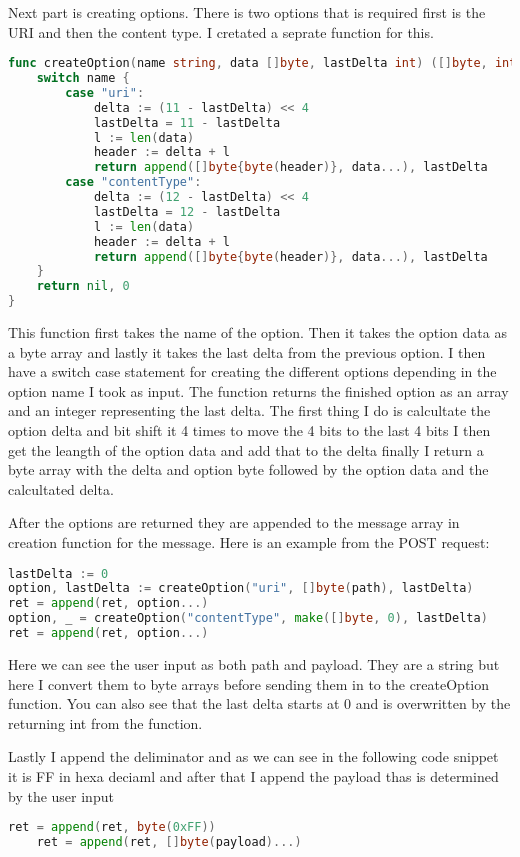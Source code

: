 \documentclass{article}
\begin{document}
    Next part is creating options. There is two options that is required first is the URI and then
    the content type. I cretated a seprate function for this.
\begin{lstlisting}[language=go]
func createOption(name string, data []byte, lastDelta int) ([]byte, int) {
    switch name {
	    case "uri":
		    delta := (11 - lastDelta) << 4
		    lastDelta = 11 - lastDelta
		    l := len(data)
		    header := delta + l
		    return append([]byte{byte(header)}, data...), lastDelta
	    case "contentType":
		    delta := (12 - lastDelta) << 4
		    lastDelta = 12 - lastDelta
		    l := len(data)
		    header := delta + l
		    return append([]byte{byte(header)}, data...), lastDelta
	}
	return nil, 0
}
\end{lstlisting}
This function first takes the name of the option. Then it takes the option data as a byte array
and lastly it takes the last delta from the previous option. I then have a switch case statement
for creating the different options depending in the option name I took as input.
The function returns the finished option as an array and an integer representing the last delta.
The first thing I do is calcultate the option delta and bit shift it 4 times to move the 4 bits to the last 4 bits
I then get the leangth of the option data and add that to the delta
finally I return a byte array with the delta and option byte followed by the option data and the calcultated delta.

After the options are returned they are appended to the message array in creation function
for the message. Here is an example from the POST request:
\begin{lstlisting}[language=go]
lastDelta := 0
option, lastDelta := createOption("uri", []byte(path), lastDelta)
ret = append(ret, option...)
option, _ = createOption("contentType", make([]byte, 0), lastDelta)
ret = append(ret, option...)
\end{lstlisting}
Here we can see the user input as both path and payload. They are a string but here I convert
them to byte arrays before sending them in to the createOption function. You can also see
that the last delta starts at 0 and is overwritten by the returning int from the function.

Lastly I append the deliminator and as we can see in the following code snippet it is FF in
hexa deciaml and after that I append the payload thas is determined by the user input

\begin{lstlisting}[language=go]
    ret = append(ret, byte(0xFF))
	ret = append(ret, []byte(payload)...)
\end{lstlisting}
\end{document}
